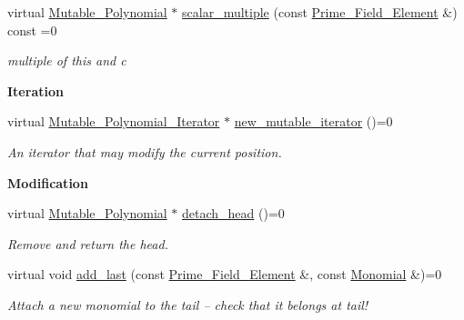 \begin{Indent}
\begin{DoxyCompactItemize}
\mbox{\label{group__polygroup_a48d28e7a5fc543e18511f2dd24739ad7}} 
virtual \hyperlink{group__polygroup_class_mutable___polynomial}{Mutable\+\_\+\+Polynomial} $\ast$ \hyperlink{group__polygroup_a48d28e7a5fc543e18511f2dd24739ad7}{scalar\+\_\+multiple} (const \hyperlink{group___fields_group_class_prime___field___element}{Prime\+\_\+\+Field\+\_\+\+Element} \&) const =0
\begin{DoxyCompactList}\small\item\em multiple of this and c \end{DoxyCompactList}\end{DoxyCompactItemize}
\end{Indent}
\begin{Indent}\textbf{ Iteration}\par
\begin{DoxyCompactItemize}
\item 
\mbox{\label{group__polygroup_a803892196221e618214c80987cec191a}} 
virtual \hyperlink{group___iterator_group_class_mutable___polynomial___iterator}{Mutable\+\_\+\+Polynomial\+\_\+\+Iterator} $\ast$ \hyperlink{group__polygroup_a803892196221e618214c80987cec191a}{new\+\_\+mutable\+\_\+iterator} ()=0
\begin{DoxyCompactList}\small\item\em An iterator that may modify the current position. \end{DoxyCompactList}\end{DoxyCompactItemize}
\end{Indent}
\begin{Indent}\textbf{ Modification}\par
\begin{DoxyCompactItemize}
\item 
\mbox{\label{group__polygroup_a3acd7e39f907f95ab05a9ee68af7556c}} 
virtual \hyperlink{group__polygroup_class_mutable___polynomial}{Mutable\+\_\+\+Polynomial} $\ast$ \hyperlink{group__polygroup_a3acd7e39f907f95ab05a9ee68af7556c}{detach\+\_\+head} ()=0
\begin{DoxyCompactList}\small\item\em Remove and return the head. \end{DoxyCompactList}\item 
\mbox{\label{group__polygroup_a966bd6c897acf04ac697bc0a4ca46a89}} 
virtual void \hyperlink{group__polygroup_a966bd6c897acf04ac697bc0a4ca46a89}{add\+\_\+last} (const \hyperlink{group___fields_group_class_prime___field___element}{Prime\+\_\+\+Field\+\_\+\+Element} \&, const \hyperlink{group__polygroup_class_monomial}{Monomial} \&)=0
\begin{DoxyCompactList}\small\item\em Attach a new monomial to the tail -- check that it belongs at tail! \end{DoxyCompactList}\end{DoxyCompactItemize}
\end{Indent}
